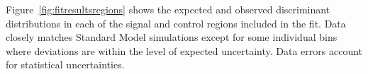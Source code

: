Figure~\ref{fig:fitresultsregions} shows the expected and observed discriminant distributions in each of the signal and control regions included in the fit. Data closely matches Standard Model simulations except for some individual bins where deviations are within the level of expected uncertainty. Data errors account for statistical uncertainties. 

\begin{figure}[!h]
\centering
  \hfill
  \hfill
  \hfill
  \hfill
\end{figure}
